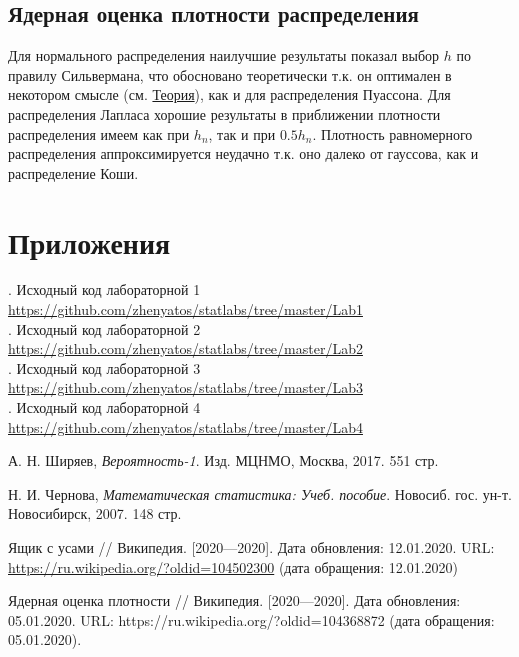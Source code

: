 \documentclass[12pt,a4paper]{article}
\begin{document}
\subsection{Ядерная оценка плотности распределения}
Для нормального распределения наилучшие результаты показал выбор $h$ по правилу Сильвермана, что обосновано теоретически т.к. он оптимален в некотором смысле (см. \hyperref[silverman]{Теория}), как и для распределения Пуассона. Для распределения Лапласа хорошие результаты в приближении плотности распределения имеем как при $h_n$, так и при $0.5h_n$. Плотность равномерного распределения аппроксимируется неудачно т.к. оно далеко от гауссова, как и распределение Коши.

\pagebreak

\section{Приложения}
. Исходный код лабораторной 1 {\url{https://github.com/zhenyatos/statlabs/tree/master/Lab1}} \\
. Исходный код лабораторной 2  {\url{https://github.com/zhenyatos/statlabs/tree/master/Lab2}} \\
. Исходный код лабораторной 3  {\url{https://github.com/zhenyatos/statlabs/tree/master/Lab3}} \\
. Исходный код лабораторной 4 {\url{https://github.com/zhenyatos/statlabs/tree/master/Lab4}}

\begin{thebibliography}{9} 
	 А. Н. Ширяев, \emph{Вероятность-1}. Изд. МЦНМО, Москва, 2017. 551 стр. 
	
	 Н. И. Чернова, \emph{Математическая статистика: Учеб. пособие}. Новосиб. гос. ун-т. Новосибирск, 2007. 148 стр.
	
	 Ящик с усами // Википедия. [2020—2020]. Дата обновления: 12.01.2020. URL: \url{https://ru.wikipedia.org/?oldid=104502300} (дата обращения: 12.01.2020)
	
	 Ядерная оценка плотности // Википедия. [2020—2020]. Дата обновления: 05.01.2020. URL: https://ru.wikipedia.org/?oldid=104368872 (дата обращения: 05.01.2020).
\end{thebibliography}
\end{document}
